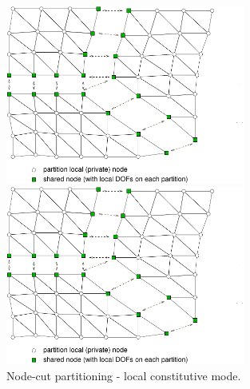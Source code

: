 \documentclass[a4paper]{article}
\begin{document}
\begin{figure}[htb]
\begin{htmlonly}
  \centerline{\includegraphics[width=0.7\textwidth]{nodecut1cb}}
\end{htmlonly}
\centerline{\includegraphics[width=0.7\textwidth]{nodecut1cb}}
\caption{Node-cut partitioning - local constitutive mode.}
\label{nodecut-lm}
\end{figure}
\end{document}

